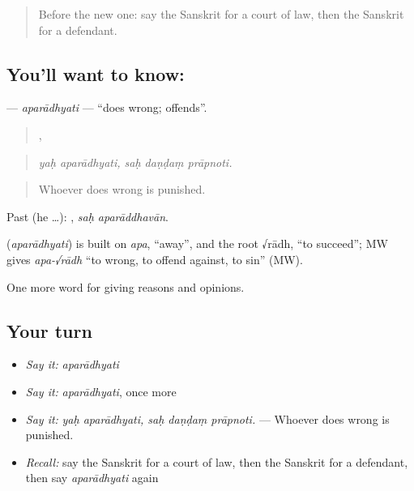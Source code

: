 \label{lesson:SA-C349-aparadhyati}



\begin{quote}
Before the new one: say the Sanskrit for a court of law, then the Sanskrit for a defendant.
\end{quote}

\subsection*{You'll want to know: }
\textbf{} — \emph{aparādhyati} — \textquotedblleft{}does wrong; offends\textquotedblright{}.

\begin{quote}
 ,   
\end{quote}

\begin{quote}
\emph{yaḥ aparādhyati, saḥ daṇḍaṃ prāpnoti.}
\end{quote}

\begin{quote}
Whoever does wrong is punished.
\end{quote}

Past (he …):  , \emph{saḥ aparāddhavān}.

\begin{cousinweb}
\textbf{} (\emph{aparādhyati}) is built on \emph{apa}, \textquotedblleft{}away\textquotedblright{}, and the root √rādh, \textquotedblleft{}to succeed\textquotedblright{}; MW gives \emph{apa-√rādh} \textquotedblleft{}to wrong, to offend against, to sin\textquotedblright{} (MW).
\end{cousinweb}

\begin{grammarlens}[title={What you've built}]
One more word for giving reasons and opinions.
\end{grammarlens}

\subsection*{Your turn}
\begin{itemize}
\raggedright
  \item \emph{Say it:} \emph{aparādhyati}
  \item \emph{Say it:} \emph{aparādhyati}, once more
  \item \emph{Say it:} \emph{yaḥ aparādhyati, saḥ daṇḍaṃ prāpnoti.} — Whoever does wrong is punished.
  \item \emph{Recall:} say the Sanskrit for a court of law, then the Sanskrit for a defendant, then say \emph{aparādhyati} again
\end{itemize}

